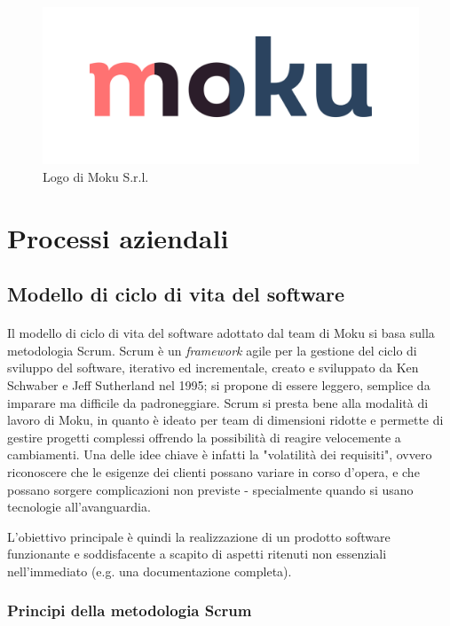 \begin{figure}[h!]
    \includegraphics[width=\textwidth]{figures/logo_moku.png}
    \caption[Logo Moku]{Logo di Moku S.r.l.
    \label{fig:logomoku}}
\end{figure}    

\section{Processi aziendali}
\subsection{Modello di ciclo di vita del software}
\paragraph{}
Il modello di ciclo di vita del software adottato dal team di Moku si basa sulla metodologia Scrum. Scrum è un \textit{framework} agile per la gestione del ciclo di sviluppo del software, iterativo ed incrementale, creato e sviluppato da Ken Schwaber e Jeff Sutherland nel 1995; si propone di essere leggero, semplice da imparare ma difficile da padroneggiare. Scrum si presta bene alla modalità di lavoro di Moku, in quanto è ideato per team di dimensioni ridotte e permette di gestire progetti complessi offrendo la possibilità di reagire velocemente a cambiamenti. Una delle idee chiave è infatti la "volatilità dei requisiti", ovvero riconoscere che le esigenze dei clienti possano variare in corso d'opera, e che possano sorgere complicazioni non previste - specialmente quando si usano tecnologie all'avanguardia.

L'obiettivo principale è quindi la realizzazione di un prodotto software funzionante e soddisfacente a scapito di aspetti ritenuti non essenziali nell'immediato (e.g. una documentazione completa).

\subsubsection{Principi della metodologia Scrum}
